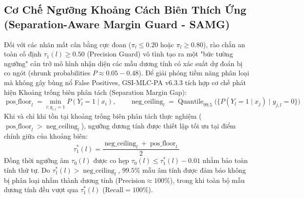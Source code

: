 \documentclass[10pt,a4paper]{article}
\begin{document}
\subsection{Cơ Chế Ngưỡng Khoảng Cách Biên Thích Ứng (Separation-Aware Margin Guard - SAMG)}
Đối với các nhãn mất cân bằng cực đoan ($\pi_l \le 0.20$ hoặc $\pi_l \ge 0.80$), rào chắn an toàn cố định $\tau_1(l) \ge 0.50$ (Precision Guard) vô tình tạo ra một "bức tường ngưỡng" cản trở mô hình nhận diện các mẫu dương tính có xác suất dự đoán bị co ngót (shrunk probabilities $P \approx 0.05 - 0.48$). Để giải phóng tiềm năng phân loại mà không gây bùng nổ False Positives, GSI-MLC-PA v6.3.3 tích hợp cơ chế phát hiện Khoảng trống biên phân tách (Separation Margin Gap):
\begin{equation}
    \operatorname{pos\_floor}_l = \min_{i: y_{i, l} = 1} P(Y_l = 1 \mid x_i), \qquad \operatorname{neg\_ceiling}_l = \operatorname{Quantile}_{99.5}\Big(\{P(Y_l = 1 \mid x_j) \mid y_{j, l} = 0\}\Big)
\end{equation}
Khi và chỉ khi tồn tại khoảng trống biên phân tách thực nghiệm ($\operatorname{pos\_floor}_l > \operatorname{neg\_ceiling}_l$), ngưỡng dương tính được thiết lập tối ưu tại điểm chính giữa của khoảng biên:
\begin{equation}
    \tau_1^*(l) = \frac{\operatorname{neg\_ceiling}_l + \operatorname{pos\_floor}_l}{2}
\end{equation}
Đồng thời ngưỡng âm $\tau_0(l)$ được co hẹp $\tau_0(l) \le \tau_1^*(l) - 0.01$ nhằm bảo toàn tính thứ tự. Do $\tau_1^*(l) > \operatorname{neg\_ceiling}_l$, $99.5\%$ mẫu âm tính được đảm bảo không bị phân loại nhầm thành dương tính ($\text{Precision} \approx 100\%$), trong khi toàn bộ mẫu dương tính đều vượt qua $\tau_1^*(l)$ ($\text{Recall} = 100\%$).
\end{document}

